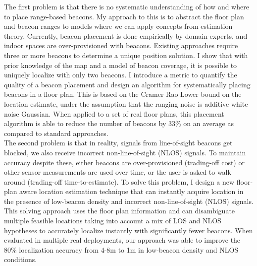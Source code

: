 \documentclass[10pt]{article}
\begin{document}
The first problem is that there is no systematic understanding of how and where to place range-based beacons. My approach to this is to abstract the floor plan and beacon ranges to models where we can apply concepts from estimation theory. Currently, beacon placement is done empirically by domain-experts, and indoor spaces are over-provisioned with beacons. Existing approaches require three or more beacons to determine a unique position solution. I show that with prior knowledge of the map and a model of beacon coverage, it is possible to uniquely localize with only two beacons. I introduce a metric to quantify the quality of a beacon placement and design an algorithm for systematically placing beacons in a floor plan. This is based on the Cramer Rao Lower bound on the location estimate, under the assumption that the ranging noise is additive white noise Gaussian. When applied to a set of real floor plans, this placement algorithm is able to reduce the number of beacons by 33\% on an average as compared to standard approaches. \\

The second problem is that in reality, signals from line-of-sight beacons get blocked, we also receive incorrect non-line-of-sight (NLOS) signals. To maintain accuracy despite these, either beacons are over-provisioned (trading-off cost) or other sensor measurements are used over time, or the user is asked to walk around (trading-off time-to-estimate). To solve this problem, I design a new floor-plan aware location estimation technique that can instantly acquire location  
in the presence of low-beacon density and incorrect non-line-of-sight (NLOS) signals. 
This solving approach uses the floor plan information and can disambiguate multiple feasible locations taking into account a mix of LOS and NLOS hypotheses to accurately localize instantly with significantly fewer beacons. When evaluated in multiple real deployments, our approach was able to improve the 80\% localization accuracy from 4-8m to 1m in low-beacon density and NLOS conditions.\\
\end{document}
